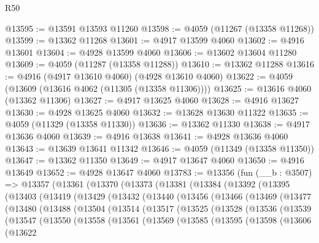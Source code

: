 \begin{lexlean}{R50}
\begin{coremodule}
@13595 := @13591 @13593 @11260
@13598 := @4059 (@11267 (@13358 @11268))
@13599 := @13362 @11268
@13601 := @4917 @13599 @4060
@13602 := @4916 @13601
@13604 := @4928 @13599 @4060
@13606 := @13602 @13604 @11280
@13609 := @4059 (@11287 (@13358 @11288))
@13610 := @13362 @11288
@13616 := @4916 (@4917 @13610 @4060) (@4928 @13610 @4060)
@13622 := @4059 (@13609 (@13616 @4062 (@11305 (@13358 @11306))))
@13625 := @13616 @4060 (@13362 @11306)
@13627 := @4917 @13625 @4060
@13628 := @4916 @13627
@13630 := @4928 @13625 @4060
@13632 := @13628 @13630 @11322
@13635 := @4059 (@11329 (@13358 @11330))
@13636 := @13362 @11330
@13638 := @4917 @13636 @4060
@13639 := @4916 @13638
@13641 := @4928 @13636 @4060
@13643 := @13639 @13641 @11342
@13646 := @4059 (@11349 (@13358 @11350))
@13647 := @13362 @11350
@13649 := @4917 @13647 @4060
@13650 := @4916 @13649
@13652 := @4928 @13647 @4060
@13783 := @13356
    (fun (__b : @3507) =>
    @13357
      (@13361
        (@13370
          (@13373
            (@13381
              (@13384
                (@13392
                  (@13395
                    (@13403
                      (@13419
                        (@13429
                          (@13432
                            (@13440
                              (@13456
                                (@13466
                                  (@13469
                                    (@13477
                                      (@13480
                                        (@13488
                                          (@13504
                                            (@13514
                                              (@13517
                                                (@13525
                                                  (@13528
                                                    (@13536
                                                      (@13539
                                                        (@13547
                                                          (@13550
                                                            (@13558
                                                              (@13561
                                                                (@13569
                                                                  (@13585
                                                                    (@13595
                                                                      (@13598
                                                                        (@13606
                                                                          (@13622

\end{coremodule}
\end{lexlean}
